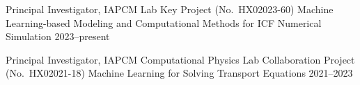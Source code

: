 \begin{cventries}

  \cventry
  {Principal Investigator, IAPCM Lab Key Project (No.~HX02023-60)} %
  {Machine Learning-based Modeling and Computational Methods for ICF Numerical Simulation} %
  {} %
  {2023--present} %
  {} %

  \cventry
  {Principal Investigator, IAPCM Computational Physics Lab Collaboration Project (No.~HX02021-18)} %
  {Machine Learning for Solving Transport Equations} %
  {} %
  {2021--2023} %
  {} %

\end{cventries}
